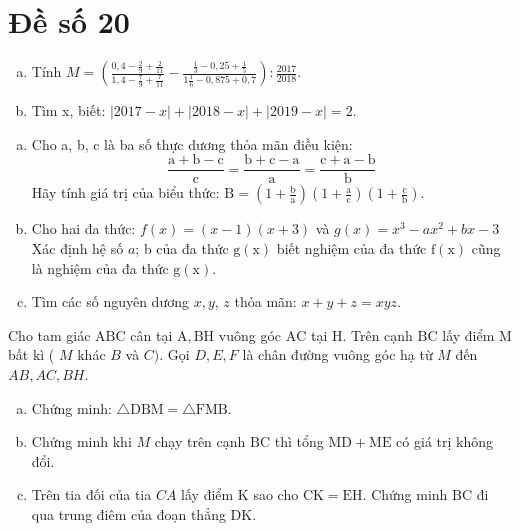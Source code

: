 \onehalfspacing
\section{Đề số 20}

\begin{bt} 
    \hfil
    \begin{enumerate}[a.]
        \item Tính $M=\left(\frac{0,4-\frac{2}{9}+\frac{2}{11}}{1,4-\frac{7}{9}+\frac{7}{11}}-\frac{\frac{1}{3}-0,25+\frac{1}{5}}{1 \frac{1}{6}-0,875+0,7}\right): \frac{2017}{2018}$.
        \item Tìm x, biết: $|2017-x|+|2018-x|+|2019-x|=2$.
    \end{enumerate}
\loigiai{}
\end{bt}

\begin{bt}
    \hfill
	\begin{enumerate}[a.]
        \item Cho a, b, c là ba số thực dương thỏa mãn điều kiện:
        $$
        \frac{\mathrm{a}+\mathrm{b}-\mathrm{c}}{\mathrm{c}}=\frac{\mathrm{b}+\mathrm{c}-\mathrm{a}}{\mathrm{a}}=\frac{\mathrm{c}+\mathrm{a}-\mathrm{b}}{\mathrm{b}}
        $$
        Hãy tính giá trị của biểu thức: $\mathrm{B}=\left(1+\frac{\mathrm{b}}{\mathrm{a}}\right)\left(1+\frac{\mathrm{a}}{\mathrm{c}}\right)\left(1+\frac{\mathrm{c}}{\mathrm{b}}\right)$.
        \item Cho hai đa thức: $f(x)=(x-1)(x+3)$ và $g(x)=x^3-a x^2+b x-3$
        Xác định hệ số $a$; b của đa thức $\mathrm{g}(\mathrm{x})$ biết nghiệm của đa thức $\mathrm{f}(\mathrm{x})$ cũng là nghiệm của đa thức $\mathrm{g}(\mathrm{x})$.
        \item Tìm các số nguyên dương $x, y$, $z$ thỏa mãn: $x+y+z=x y z$.
    \end{enumerate}
	\loigiai{} 
\end{bt}

\begin{bt}
    Cho tam giác $\mathrm{ABC}$ cân tại $\mathrm{A}, \mathrm{BH}$ vuông góc $\mathrm{AC}$ tại $\mathrm{H}$. Trên cạnh $\mathrm{BC}$ lấy điểm $\mathrm{M}$ bất kì ( $M$ khác $B$ và $C)$. Gọi $D, E, F$ là chân đường vuông góc hạ từ $M$ đến $A B, A C, B H$.
	\begin{enumerate}[a.]
        \item Chứng minh: $\triangle \mathrm{DBM}=\triangle \mathrm{FMB}$.
        \item Chứng minh khi $M$ chạy trên cạnh $\mathrm{BC}$ thì tổng $\mathrm{MD}+\mathrm{ME}$ có giá trị không đổi.
        \item Trên tia đối của tia $CA$ lấy điểm $\mathrm{K}$ sao cho $\mathrm{CK}=\mathrm{EH}$.
        Chứng minh $\mathrm{BC}$ đi qua trung điêm của đoạn thẳng $\mathrm{DK}$.
    \end{enumerate}
	\loigiai{}
\end{bt}

